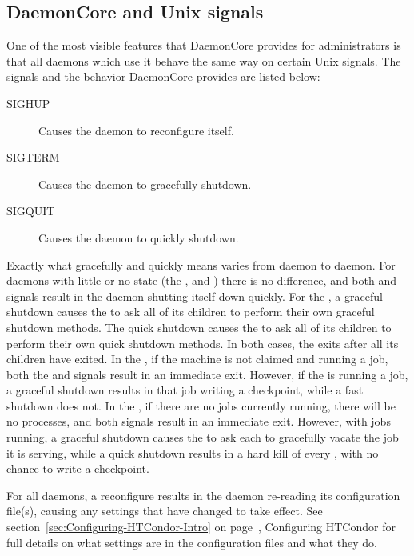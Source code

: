 \subsection{\label{sec:DaemonCore-Signals}DaemonCore and Unix signals}

One of the most visible features that DaemonCore provides for
administrators is that all daemons which use it behave the same way on
certain Unix signals.  The signals and the behavior DaemonCore
provides are listed below:

\begin{description}
\item[SIGHUP] Causes the daemon to reconfigure itself.
\item[SIGTERM] Causes the daemon to gracefully shutdown.
\item[SIGQUIT] Causes the daemon to quickly shutdown.
\end{description}

Exactly what gracefully and quickly means varies from daemon
to daemon.  For daemons with little or no state 
(the ,  and )
there is no difference, and both  and  signals
result in the daemon shutting itself down quickly.
For the ,
a graceful shutdown causes the  to ask all of 
its children to perform their own graceful shutdown methods.
The quick shutdown causes the  to ask all of 
its children to perform their own quick shutdown methods.
In both cases, the  exits after all its children have exited.
In the , if the machine is not claimed and running a job, 
both the  and  signals result in an immediate exit.
However, if the  is running a job,
a graceful shutdown results in that job writing a checkpoint,
while a fast shutdown does not.
In the , if there are no jobs currently running,
there will be no  processes,
and both signals result in an immediate exit.
However, with jobs running, a graceful shutdown causes
the  to ask each  to gracefully vacate
the job it is serving, 
while a quick shutdown results in a hard kill of every ,
with no chance to write a checkpoint.  

For all daemons, a reconfigure results in the daemon re-reading
its configuration file(s), causing any settings that have changed
to take effect.
See section~\ref{sec:Configuring-HTCondor-Intro} on
page~\pageref{sec:Configuring-HTCondor-Intro}, Configuring HTCondor for full
details on what settings are in the configuration files and what they do.

